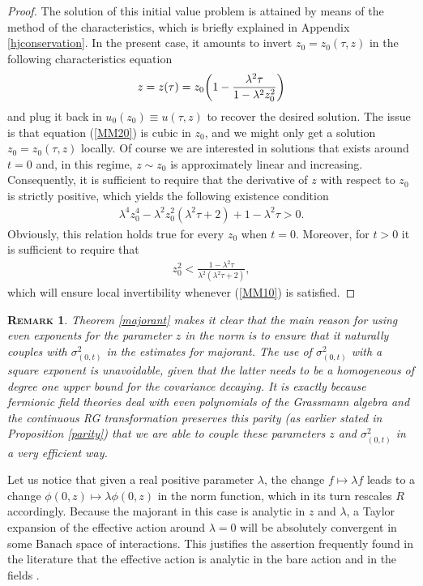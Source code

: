 \documentclass[12pt,twoside]{amsart}
\newtheorem{rem}{\textsc{Remark}}[section]
\numberwithin{equation}{section}
\begin{document}
\begin{proof}
The solution of this initial value problem is attained by means of the method of the characteristics, which is briefly explained in Appendix \ref{hjconservation}. In the present case, it amounts to invert $z_{0} = z_{0}(\tau,z)$ in the following characteristics equation
\begin{eqnarray}
z = z(\tau) = z_{0}\bigg{(}1-\frac{\lambda^{2}\tau}{1-\lambda^{2}z_{0}^{2}}\bigg{)} \label{MM20}
\end{eqnarray}
and plug it back in $u_{0}(z_{0}) \equiv u(\tau,z)$ to recover the desired solution. The issue is that equation (\ref{MM20}) is cubic in $z_{0}$, and we might only get a solution $z_{0} = z_{0}(\tau,z)$ locally. Of course we are interested in solutions that exists around $t = 0$ and, in this regime, $z \sim z_{0}$ is approximately linear and increasing. Consequently, it is sufficient to require that the derivative of $z$ with respect to $z_{0}$ is strictly positive, which yields the following existence condition
\begin{eqnarray}
\lambda^{4}z_{0}^{4} - \lambda^{2}z_{0}^{2}(\lambda^{2}\tau+2) +1-\lambda^{2}\tau > 0. \label{MM21}
\end{eqnarray}
Obviously, this relation holds true for every $z_{0}$ when $t = 0$. Moreover, for $t > 0$ it is sufficient to require that 
\begin{eqnarray}
z_{0}^{2} < \frac{1-\lambda^{2}\tau}{\lambda^{2}(\lambda^{2}\tau +2)}, \label{MM22}
\end{eqnarray}
which will ensure local invertibility whenever (\ref{MM10}) is satisfied. 
\end{proof}

\begin{rem}\label{remarkpowerz} Theorem \ref{majorant} makes it clear that the main reason for using even exponents for the parameter $z$ in the norm is to ensure that it naturally couples with $\sigma_{(0,t)}^{2}$ in the estimates for majorant. The use of $\sigma_{(0,t)}^{2}$ with a square exponent is unavoidable, given that the latter needs to be a homogeneous of degree one upper bound for the covariance decaying. It is exactly because fermionic field theories deal with even polynomials of the Grassmann algebra and the continuous RG transformation preserves this parity (as earlier stated in Proposition \ref{parity}) that we are able to couple these parameters $z$ and $\sigma_{(0,t)}^{2}$ in a very efficient way. 
\end{rem}

Let us notice that given a real positive parameter $\lambda$, the change $f \mapsto \lambda f$ leads to a change $\phi(0,z) \mapsto \lambda \phi(0,z)$ in the norm function, which in its turn rescales $R$ accordingly. Because the majorant in this case is analytic in $z$ and $\lambda$, a Taylor expansion of the effective action around $\lambda = 0$ will be absolutely convergent in some Banach space of interactions. This justifies the assertion frequently found in the literature that the effective action is analytic in the bare action and in the fields \cite{brydges1987expansions, BryKen, SW}. 
\end{document}
